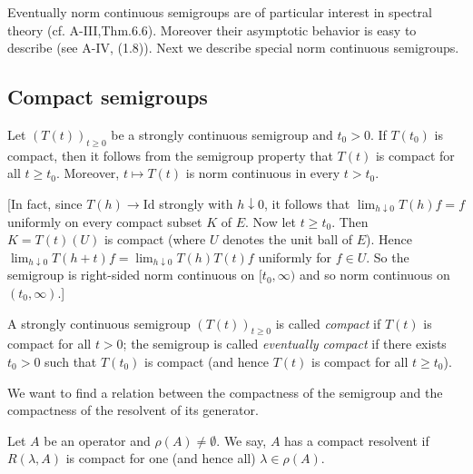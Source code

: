 Eventually norm continuous semigroups are of particular interest in spectral theory (cf. A-III,Thm.6.6).
Moreover their asymptotic behavior is easy to describe (see A-IV, (1.8)).
Next we describe special norm continuous semigroups.
\subsection{Compact semigroups} \label{subsec:a2-1.se7}

Let $(T(t))_{t\geq 0}$ be a strongly continuous semigroup and $t_0 > 0$.
If $T(t_0)$ is compact, then it follows from the semigroup property that $T(t)$ is compact for all $t \geq t_0$.
Moreover, $t \mapsto T(t)$ is norm continuous in every $t > t_0$.

[In fact, since $T(h) \to \text{Id}$ strongly with $h \downarrow 0$, it follows that $\lim_{h \downarrow 0} T(h)f = f$ uniformly on every compact subset $K$ of $E$.
Now let $t \geq t_0$.
Then $K = T(t)(U)$ is compact (where $U$ denotes the unit ball of $E$).
Hence $\lim_{h \downarrow 0} T(h+t)f = \lim_{h \downarrow 0} T(h)T(t)f$ uniformly for $f \in U$.
So the semigroup is right-sided norm continuous on $[t_0,\infty)$ and so norm continuous on $(t_0,\infty)$.]

\begin{definition}\label{def:a2-1.22}
A strongly continuous semigroup $(T(t))_{t\geq 0}$ is called \emph{compact} if $T(t)$ is compact for all $t > 0$; the semigroup is called \emph{eventually compact} if there exists $t_0 > 0$ such that $T(t_0)$ is compact (and hence $T(t)$ is compact for all $t \geq t_0$).
\end{definition}

We want to find a relation between the compactness of the semigroup and the compactness of the resolvent of its generator.

\begin{definition}\label{def:a2-1.23}
Let $A$ be an operator and $\rho(A) \neq \emptyset$.
We say, $A$ has a compact resolvent if $R(\lambda,A)$ is compact for one (and hence all) $\lambda \in \rho(A)$.
\end{definition}

